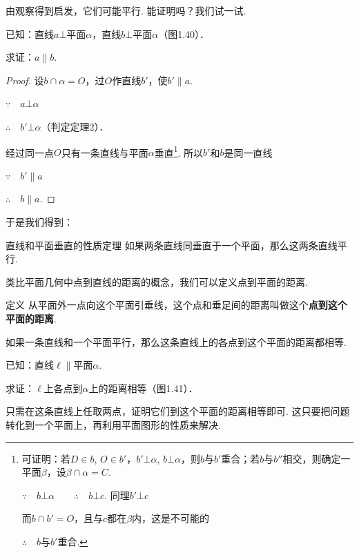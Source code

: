 由观察得到启发，它们可能平行. 能证明吗？我们试一试.

已知：直线$a\bot$平面$\alpha$，直线$b\bot$平面$\alpha$（图1.40）．

求证：$a\parallel b$.

\begin{proof}
    设$b\cap \alpha=O$，过$O$作直线$b'$，使$b'\parallel a$.

$\because\quad    a\bot \alpha$

$\therefore\quad b'\bot \alpha$（判定定理2）．

经过同一点$O$只有一条直线与平面$\alpha$垂直\footnote{可证明：若$D\in b$, $O\in b'$，$b'\bot\alpha$, $b\bot\alpha$，则$b$与$b'$重合；若$b$与$b''$相交，则确定一平面$\beta$，设$\beta\cap \alpha=C$.

$\because\quad b\bot\alpha\qquad \therefore\quad b\bot c$. 同理$b'\bot c$

而$b\cap b'=O$，且与$c$都在$\beta$内，这是不可能的

$\therefore\quad b$与$b'$重合.}. 所以$b'$和$b$是同一直线

$\because\quad b'\parallel a$

$\therefore\quad b\parallel a$.
\end{proof}

于是我们得到：

\begin{thm}
{直线和平面垂直的性质定理}
如果两条直线同垂直于一个平面，那么这两条直线平行.    
\end{thm}

类比平面几何中点到直线的距离的概念，我们可以定义点到平面的距离.

\begin{thm}
    {定义} 从平面外一点向这个平面引垂线，这个点和垂足间的距离叫做这个\textbf{点到这个平面的距离}.
\end{thm}

\begin{example}
    如果一条直线和一个平面平行，那么这条直线上的各点到这个平面的距离都相等.

已知：直线$\ell\parallel $平面$\alpha$.

求证：$\ell$上各点到$\alpha$上的距离相等（图1.41）．
\end{example}

\begin{analyze}
只需在这条直线上任取两点，证明它们到这个平面的距离相等即可. 这只要把问题转化到一个平面上，再利用平面图形的性质来解决.
\end{analyze}

